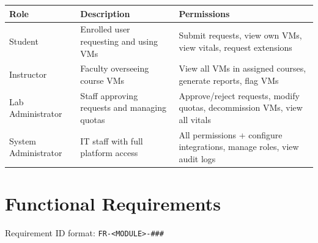 \documentclass[12pt,letterpaper]{article}
\newcommand{\code}[1]{\texttt{\color{codegray}#1}}
\begin{document}
\begin{tabularx}{\linewidth}{L{3.5cm} L{4.5cm} L{6cm}}
  \toprule
  \textbf{Role} & \textbf{Description} & \textbf{Permissions} \\
  \midrule
  Student & Enrolled user requesting and using VMs & Submit requests, view own VMs, view vitals, request extensions \\
  \addlinespace
  Instructor & Faculty overseeing course VMs & View all VMs in assigned courses, generate reports, flag VMs \\
  \addlinespace
  Lab Administrator & Staff approving requests and managing quotas & Approve/reject requests, modify quotas, decommission VMs, view all vitals \\
  \addlinespace
  System Administrator & IT staff with full platform access & All permissions + configure integrations, manage roles, view audit logs \\
  \bottomrule
\end{tabularx}

\section{Functional Requirements}

Requirement ID format: \code{FR-<MODULE>-\#\#\#}
\end{document}
